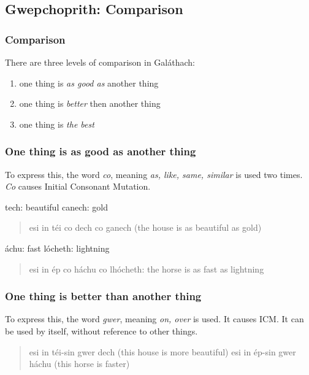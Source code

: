 \subsection{Gwepchoprith: Comparison}

\subsubsection{Comparison}

There are three levels of comparison in Gal\'{a}thach:
\begin{enumerate}
\item one thing is \textit{as good as} another thing
\item one thing is \textit{better} then another thing
\item one thing is \textit{the best}
\end{enumerate}

\subsubsection{One thing is as good as another thing}

To express this, the word \textit{co}, meaning \textit{as, like, same, similar} is used two times. \textit{Co} causes Initial Consonant Mutation.

tech: beautiful
canech: gold
\begin{quote}
esi in t\'{e}i co dech co ganech (the house is as beautiful as gold)
\end{quote}

\'{a}chu: fast
l\'{o}cheth: lightning
\begin{quote}
esi in \'{e}p co h\'{a}chu co lh\'{o}cheth: the horse is as fast as lightning
\end{quote}

\subsubsection{One thing is better than another thing}

To express this, the word \textit{gwer}, meaning \textit{on, over} is used. It causes ICM. It can be used by itself, without reference to other things.

\begin{quote}
esi in t\'{e}i-sin gwer dech (this house is more beautiful)
esi in \'{e}p-sin gwer h\'{a}chu (this horse is faster)
\end{quote}

